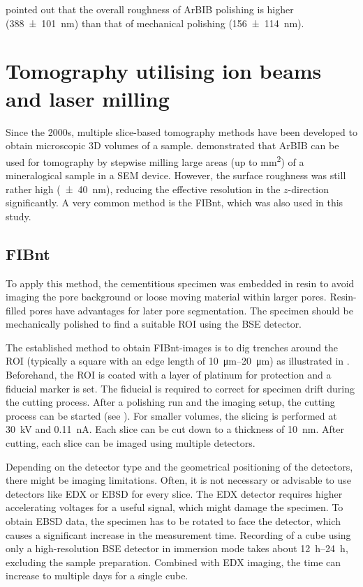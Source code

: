 \textcite{sammer.2024} pointed out that the overall roughness of \ac{ArBIB} polishing is higher (\qty{388(101)}{\nano\meter}) than that of mechanical polishing (\qty{156(114)}{\nano\meter}).   


\section{Tomography utilising ion beams and laser milling}

Since the 2000s, multiple slice-based tomography methods have been developed to obtain microscopic 3D volumes of a sample.
\textcite{desbois.2013} demonstrated that \ac{ArBIB} can be used for tomography by stepwise milling large areas (up to \unit{\square\milli\meter}) of a mineralogical sample in a \ac{SEM} device.
However, the surface roughness was still rather high (\qty{\pm 40}{\nano\meter}), reducing the effective resolution in the $z$-direction significantly.
A very common method is the \ac{FIBnt}, which was also used in this study.

\subsection{\Acl*{FIBnt}}
\label{sec:fib}

To apply this method, the cementitious specimen was embedded in resin to avoid imaging the pore background or loose moving material within larger pores.
Resin-filled pores have advantages for later pore segmentation.
The specimen should be mechanically polished to find a suitable \ac{ROI} using the \ac{BSE} detector.

The established method to obtain \ac{FIBnt}-images is to dig trenches around the \ac{ROI} (typically a square with an edge length of \qtyrange{10}{20}{\micro\meter}) as illustrated in .
Beforehand, the \ac{ROI} is coated with a layer of platinum for protection and a fiducial marker is set.
The fiducial is required to correct for specimen drift during the cutting process.
After a polishing run and the imaging setup, the cutting process can be started (see ).
For smaller volumes, the slicing is performed at \qty{30}{\kilo\volt} and \qty{0.11}{\nano\ampere}.
Each slice can be cut down to a thickness of \qty{10}{\nano\meter}.
After cutting, each slice can be imaged using multiple detectors.

Depending on the detector type and the geometrical positioning of the detectors, there might be imaging limitations.
Often, it is not necessary or advisable to use detectors like \ac{EDX} or \ac{EBSD} for every slice.
The \ac{EDX} detector requires higher accelerating voltages for a useful signal, which might damage the specimen.
To obtain \ac{EBSD} data, the specimen has to be rotated to face the detector, which causes a significant increase in the measurement time.
Recording of a  cube using only a high-resolution \ac{BSE} detector in immersion mode takes about \qtyrange{12}{24}{\hour}, excluding the sample preparation.
Combined with \ac{EDX} imaging, the time can increase to multiple days for a single cube.

